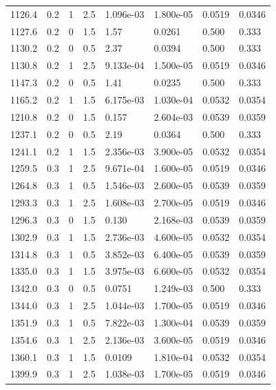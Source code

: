 \documentclass[preview]{standalone}
\begin{document}
{{{\begin{tabular}{L{1.2cm}C{1.2cm} C{0.3cm}C{0.5cm} C{1.4cm}C{1.4cm} C{1.4cm}C{1.4cm}}
  1126.4  &   0.2  & 1     & 2.5 &  1.096e-03  & 1.800e-05  & 0.0519 &  0.0346   \\ 
  1127.6  &   0.2  & 0     & 1.5 &  1.57  & 0.0261  & 0.500 &  0.333   \\ 
  1130.2  &   0.2  & 0     & 0.5 &  2.37  & 0.0394  & 0.500 &  0.333   \\ 
  1130.8  &   0.2  & 1     & 2.5 &  9.133e-04  & 1.500e-05  & 0.0519 &  0.0346   \\ 
  1147.3  &   0.2  & 0     & 0.5 &  1.41  & 0.0235  & 0.500 &  0.333   \\ 
  1165.2  &   0.2  & 1     & 1.5 &  6.175e-03  & 1.030e-04  & 0.0532 &  0.0354   \\ 
  1210.8  &   0.2  & 0     & 1.5 &  0.157  & 2.604e-03  & 0.0539 &  0.0359   \\ 
  1237.1  &   0.2  & 0     & 0.5 &  2.19  & 0.0364  & 0.500 &  0.333   \\ 
  1241.1  &   0.2  & 1     & 1.5 &  2.356e-03  & 3.900e-05  & 0.0532 &  0.0354   \\ 
  1259.5  &   0.3  & 1     & 2.5 &  9.671e-04  & 1.600e-05  & 0.0519 &  0.0346   \\ 
  1264.8  &   0.3  & 1     & 0.5 &  1.546e-03  & 2.600e-05  & 0.0539 &  0.0359   \\ 
  1293.3  &   0.3  & 1     & 2.5 &  1.608e-03  & 2.700e-05  & 0.0519 &  0.0346   \\ 
  1296.3  &   0.3  & 0     & 1.5 &  0.130  & 2.168e-03  & 0.0539 &  0.0359   \\ 
  1302.9  &   0.3  & 1     & 1.5 &  2.736e-03  & 4.600e-05  & 0.0532 &  0.0354   \\ 
  1314.8  &   0.3  & 1     & 0.5 &  3.852e-03  & 6.400e-05  & 0.0539 &  0.0359   \\ 
  1335.0  &   0.3  & 1     & 1.5 &  3.975e-03  & 6.600e-05  & 0.0532 &  0.0354   \\ 
  1342.0  &   0.3  & 0     & 0.5 &  0.0751  & 1.249e-03  & 0.500 &  0.333   \\ 
  1344.0  &   0.3  & 1     & 2.5 &  1.044e-03  & 1.700e-05  & 0.0519 &  0.0346   \\ 
  1351.9  &   0.3  & 1     & 0.5 &  7.822e-03  & 1.300e-04  & 0.0539 &  0.0359   \\ 
  1354.6  &   0.3  & 1     & 2.5 &  2.136e-03  & 3.600e-05  & 0.0519 &  0.0346   \\ 
  1360.1  &   0.3  & 1     & 1.5 &  0.0109  & 1.810e-04  & 0.0532 &  0.0354   \\ 
  1399.9  &   0.3  & 1     & 2.5 &  1.038e-03  & 1.700e-05  & 0.0519 &  0.0346   \\ 

\end{tabular}}}}
\end{document}

